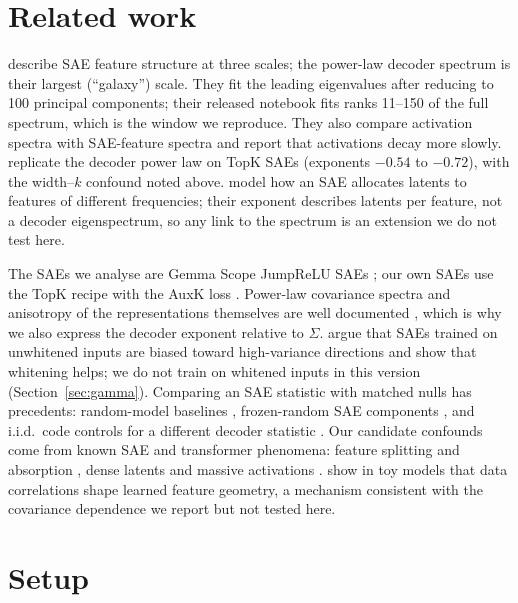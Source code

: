 \documentclass[10pt,twocolumn]{article}
\begin{document}
\section{Related work}
\label{sec:related}

\citet{li2025geometry} describe SAE feature structure at three scales; the power-law decoder spectrum is their largest (``galaxy'') scale. They fit the leading eigenvalues after reducing to 100 principal components; their released notebook fits ranks 11--150 of the full spectrum, which is the window we reproduce. They also compare activation spectra with SAE-feature spectra and report that activations decay more slowly. \citet{peter2025progressive} replicate the decoder power law on TopK SAEs (exponents $-0.54$ to $-0.72$), with the width--$k$ confound noted above. \citet{michaud2025manifolds} model how an SAE allocates latents to features of different frequencies; their exponent describes latents per feature, not a decoder eigenspectrum, so any link to the spectrum is an extension we do not test here.

The SAEs we analyse are Gemma Scope JumpReLU SAEs \citep{rajamanoharan2024jumprelu, lieberum2024gemmascope}; our own SAEs use the TopK recipe with the AuxK loss \citep{gao2024scaling}. Power-law covariance spectra and anisotropy of the representations themselves are well documented \citep{ghosh2022powerlaws, ethayarajh2019contextual}, which is why we also express the decoder exponent relative to $\Sigma$. \citet{saraswatula2025whitening} argue that SAEs trained on unwhitened inputs are biased toward high-variance directions and show that whitening helps; we do not train on whitened inputs in this version (Section~\ref{sec:gamma}). Comparing an SAE statistic with matched nulls has precedents: random-model baselines \citep{heap2025random}, frozen-random SAE components \citep{korznikov2026sanity}, and i.i.d.\ code controls for a different decoder statistic \citep{borobia2026nearfloor}. Our candidate confounds come from known SAE and transformer phenomena: feature splitting and absorption \citep{chanin2025absorption}, dense latents \citep{sun2025dense} and massive activations \citep{sun2024massive}. \citet{prieto2026correlations} show in toy models that data correlations shape learned feature geometry, a mechanism consistent with the covariance dependence we report but not tested here.

\section{Setup}
\label{sec:setup}
\end{document}
